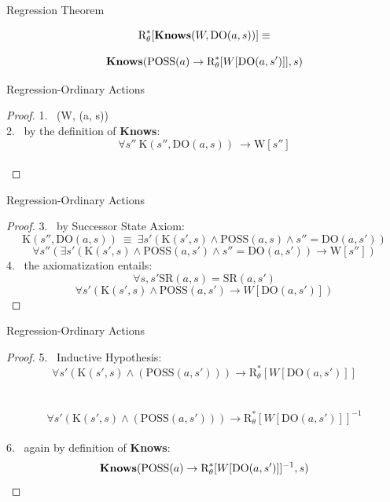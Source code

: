 \begin{frame}{Regression Theorem}
    \begin{theorem}
        \[ \text{R}^*_{\theta}[\textbf{Knows}(W, \text{DO}(a, s))] \equiv \]
            
        \[ \textbf{Knows}(\text{POSS}(a) \rightarrow \text{R}^*_{\theta}[W[\text{DO}(a, s')]], s) \]
    \end{theorem}    
\end{frame}

\begin{frame}{Regression-Ordinary Actions}
    \begin{proof}  
       1. \ \knows(W, (a, s)) \\
       2. \ by the definition of \textbf{Knows}: \ \[ \forall s'' \  \text{K}(s'', \text{DO}(a, s)) \ \rightarrow \text{W}[s''] \] \\
    \end{proof} 
\end{frame} 

\begin{frame}{Regression-Ordinary Actions}
    \begin{proof}  
       3. \ by Successor State Axiom: \[ \text{K}(s'', \text{DO}(a, s)) \ \equiv \ \exists s'(\text{K}(s',s) \land \text{POSS}(a, s) \land s'' = \text{DO}(a, s'))\]
          \[ \forall s''(\exists s'(\text{K}(s',s) \land \text{POSS}(a, s') \land s'' = \text{DO}(a, s')) \rightarrow \text{W}[s''])  \]
       4. \ the axiomatization entails: \[ \forall s,s' \text{SR}(a, s) = \text{SR}(a, s') \] 
          \[ \forall s'(\text{K}(s',s) \land \text{POSS}(a, s') \rightarrow W[\text{DO}(a, s')]) \]
    \end{proof}
\end{frame}

\begin{frame}{Regression-Ordinary Actions}

    \begin{proof}  
       5. \ Inductive Hypothesis: \[ \forall s'(\text{K}(s',s) \land (\text{POSS}(a, s'))) \rightarrow \text{R}^*_{\theta}[W[\text{DO}(a, s')]] \] \\
          \ \[ \forall s'(\text{K}(s',s) \land (\text{POSS}(a, s'))) \rightarrow \text{R}^*_{\theta}[W[\text{DO}(a, s')]]^{-1} \] \\
       
       6. \ again by definition of \textbf{Knows}: \  \[ \textbf{Knows}(\text{POSS}(a) \rightarrow \text{R}^*_{\theta}[W[\text{DO}(a, s')]]^{-1}, s) \]
    \end{proof} 

\end{frame}


